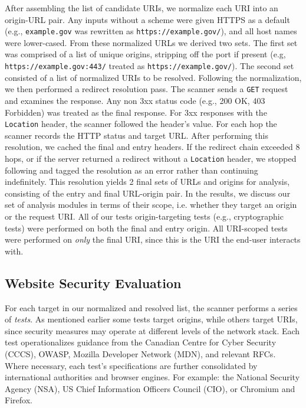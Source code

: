 \documentclass[pdflatex,sn-mathphys-num]{sn-jnl}
\numberwithin{equation}{section}
\theoremstyle{thmstyleone}
\theoremstyle{thmstyletwo}%
\theoremstyle{thmstylethree}%
\begin{document}
After assembling the list of candidate URIs, we normalize each URI into an origin-URL pair. Any inputs 
without a scheme were given HTTPS as a default (e.g., \texttt{example.gov} was rewritten as
\texttt{https://example.gov/}), and all host names were lower-cased. From these normalized URLs we derived two sets. The first set was comprised of a list of 
unique origins, stripping off the port if present (e.g, \texttt{https://example.gov:443/} treated as \texttt{https://example.gov/}). 
The second set consisted of a list of 
normalized URIs to be resolved. Following the normalization, we then performed a redirect resolution pass.
The scanner sends a \texttt{GET} request and examines the response.
Any non 3xx status code (e.g., 200 OK, 403 Forbidden) was treated as the final response. For 3xx responses with
the \texttt{Location} header, the scanner followed the header's value. For
each hop the scanner records the HTTP status and target URL. After performing this resolution, we 
cached the final and
entry headers. If the redirect chain exceeded 8 hops, 
or if the server returned a redirect without a \texttt{Location} header, we stopped following and tagged the resolution as
an error rather than continuing indefinitely. This resolution 
yields 2 final sets of URLs and origins for analysis, consisting of the entry and final URL-origin pair. In the results, we
discuss our set of analysis modules in terms of their scope, 
i.e. whether they target an origin or the request URI. All of our tests origin-targeting tests (e.g., cryptographic tests) 
were performed on both the final and entry origin. 
All URI-scoped tests were performed on \emph{only} the final URI, since this is the URI the end-user interacts with. 

\subsection{Website Security Evaluation}

For each target in our normalized and resolved list, the scanner performs a series of \emph{tests}. 
As mentioned earlier some tests target origins, while others target URIs, since security measures may operate at
different levels of the network stack. Each test operationalizes guidance from the Canadian Centre for 
Cyber Security (CCCS), OWASP, Mozilla Developer Network (MDN), and relevant RFCs. Where necessary, each test's specifications are further
consolidated by international authorities and browser engines. For example: the National Security Agency (NSA), 
US Chief Information Officers Council (CIO), or Chromium and Firefox.
\end{document}
